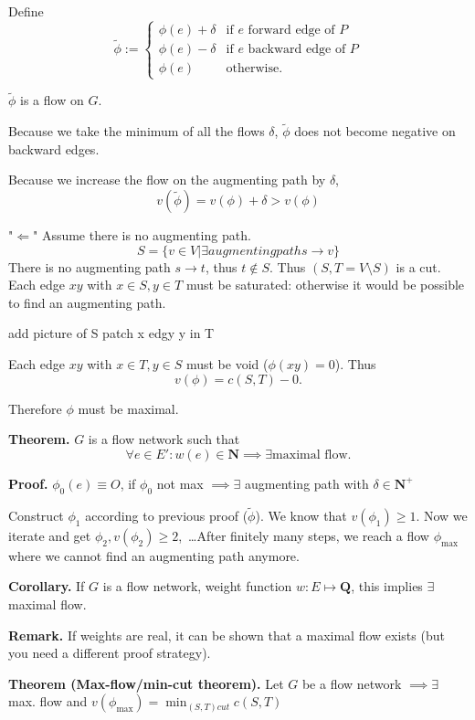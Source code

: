 Define
\[
    \tilde\phi := \begin{cases}
        \phi(e) + \delta &\text{if $e$ forward edge of $P$} \\
        \phi(e) - \delta &\text{if $e$ backward edge of $P$} \\
        \phi(e) &\text{otherwise}.
    \end{cases}
\]

$\tilde\phi$ is a flow on $G$.

Because we take the minimum of all the flows $\delta$, $\tilde\phi$ does not become negative on backward edges.

Because we increase the flow on the augmenting path by $\delta$,
\[
    v(\tilde\phi) = v(\phi) + \delta > v(\phi)
\]

"$\Leftarrow$" Assume there is no augmenting path.
\[
    S = \{v\in V | \exists augmenting path s\rightarrow v\}
\]
There is no augmenting path $s\rightarrow t$, thus $t \notin S$.
Thus $(S, T = V\setminus S)$ is a cut.
Each edge $xy$ with $x\in S, y\in T$ must be saturated: otherwise it would be possible to find an augmenting path.

\TODO add picture of S patch x edgy y in T

Each edge $xy$ with $x\in T, y\in S$ must be void ($\phi(xy) = 0$). Thus
\[
    v(\phi) = c(S,T) - 0.
\]

Therefore $\phi$ must be maximal.

\textbf{Theorem.} $G$ is a flow network such that
\[
    \forall e\in E': w(e)\in \mathbf{N} \implies \exists \text{maximal flow}.
\]

\textbf{Proof.} $ \phi_{0}(e) \equiv O$, if $\phi_{0}$ not max $\implies \exists$ augmenting path with $\delta \in \mathbf{N^{+}}$

Construct $\phi_1$ according to previous proof ($\tilde\phi$). We know that $v(\phi_1) ≥ 1$. Now we iterate and get $\phi_2, v(\phi_2) ≥ 2$,~\ldots After finitely many steps, we reach a flow $\phi_{\text{max}}$ where we cannot find an augmenting path anymore.

\textbf{Corollary.} If $G$ is a flow network, weight function $w: E\mapsto \mathbf{Q}$, this implies $\exists$ maximal flow.

\textbf{Remark.}
If weights are real, it can be shown that a maximal flow exists (but you need a different proof strategy).

\textbf{Theorem (Max-flow/min-cut theorem).}
Let $G$ be a flow network $\implies \exists$ max. flow and $v(\phi_{\text{max}})= \min_{(S,T) cut} c(S,T)$

